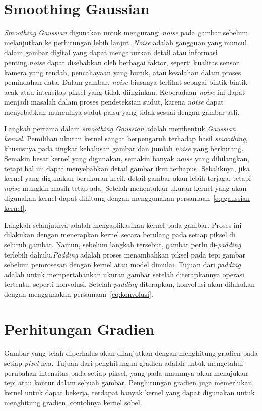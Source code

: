\section{Smoothing Gaussian}
   \emph{Smoothing Gaussian} digunakan untuk mengurangi \emph{noise} pada gambar sebelum melanjutkan ke perhitungan lebih lanjut.
\emph{Noise} adalah gangguan yang muncul dalam gambar digital yang dapat mengaburkan detail atau informasi penting.\emph{noise} dapat disebabkan oleh berbagai faktor, seperti kualitas sensor kamera yang rendah, pencahayaan yang buruk, atau kesalahan dalam proses pemindahan data.
Dalam gambar, \emph{noise} biasanya terlihat sebagai bintik-bintik acak atau intensitas piksel yang tidak diinginkan. Keberadaan \emph{noise} ini dapat menjadi masalah dalam proses pendeteksian sudut, karena \emph{noise} dapat menyebabkan munculnya sudut palsu yang tidak sesuai dengan gambar asli.
    
    Langkah pertama dalam \emph{smoothing Gaussian} adalah membentuk \emph{Gaussian kernel}. Pemilihan ukuran kernel sangat berpengaruh terhadap hasil \emph{smoothing}, khususnya pada tingkat kehalusan gambar dan jumlah \emph{noise} yang berkurang.
Semakin besar kernel yang digunakan, semakin banyak \emph{noise} yang dihilangkan, tetapi hal ini dapat menyebabkan detail gambar ikut terhapus. Sebaliknya, jika kernel yang digunakan berukuran kecil, detail gambar akan lebih terjaga, tetapi \emph{noise} mungkin masih tetap ada.
Setelah menentukan ukuran kernel yang akan digunakan kernel dapat dihitung dengan menggunakan persamaan~\eqref{eq:gaussian kernel}.

    Langkah selanjutnya adalah mengaplikasikan kernel pada gambar. Proses ini dilakukan dengan menerapkan kernel secara berulang pada setiap piksel di seluruh gambar.
Namun, sebelum langkah tersebut, gambar perlu di-\emph{padding} terlebih dahulu.\emph{Padding} adalah proses menambahkan piksel pada tepi gambar sebelum pemrosesan dengan kernel atau model dimulai.
Tujuan dari \emph{padding} adalah untuk mempertahankan ukuran gambar setelah diterapkannya operasi tertentu, seperti konvolusi. 
Setelah \emph{padding} diterapkan, konvolusi akan dilakukan dengan menggunakan persamaan~\eqref{eq:konvolusi}. 

\section{Perhitungan Gradien}
    Gambar yang telah diperhalus akan dilanjutkan dengan menghitung gradien pada setiap \emph{pixel}-nya. Tujuan dari penghitungan gradien adalah untuk mengetahui perubahan intensitas pada setiap piksel, yang pada umumnya akan menujukan tepi atau kontur dalam sebuah gambar.
Penghitungan gradien juga memerlukan kernel untuk dapat bekerja, terdapat banyak kernel yang dapat digunakan untuk menghitung gradien, contohnya kernel sobel. 

